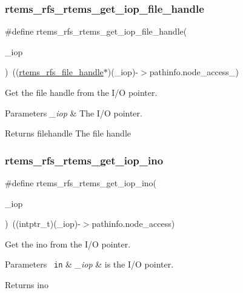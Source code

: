 \subsubsection{\texorpdfstring{rtems\_rfs\_rtems\_get\_iop\_file\_handle}{rtems\_rfs\_rtems\_get\_iop\_file\_handle}}
{\footnotesize\ttfamily \#define rtems\+\_\+rfs\+\_\+rtems\+\_\+get\+\_\+iop\+\_\+file\+\_\+handle(\begin{DoxyParamCaption}\item[{}]{\+\_\+iop }\end{DoxyParamCaption})~((\mbox{\hyperlink{rtems-rfs-file_8h_a35a0f4ad45bd35ea0af7df0aa0ad893b}{rtems\+\_\+rfs\+\_\+file\+\_\+handle}}$\ast$)(\+\_\+iop)-\/$>$pathinfo.\+node\+\_\+access\+\_)}

Get the file handle from the I/O pointer.


\begin{DoxyParams}{Parameters}
{\em \+\_\+iop} & The I/O pointer. \\
\hline
\end{DoxyParams}
\begin{DoxyReturn}{Returns}
filehandle The file handle 
\end{DoxyReturn}
\mbox{\label{rtems-rfs-rtems_8h_a456d40a3292d116678781f8efa96e632}} 
\subsubsection{\texorpdfstring{rtems\_rfs\_rtems\_get\_iop\_ino}{rtems\_rfs\_rtems\_get\_iop\_ino}}
{\footnotesize\ttfamily \#define rtems\+\_\+rfs\+\_\+rtems\+\_\+get\+\_\+iop\+\_\+ino(\begin{DoxyParamCaption}\item[{}]{\+\_\+iop }\end{DoxyParamCaption})~((intptr\+\_\+t)(\+\_\+iop)-\/$>$pathinfo.\+node\+\_\+access)}

Get the ino from the I/O pointer.


\begin{DoxyParams}[1]{Parameters}
\mbox{\texttt{ in}}  & {\em \+\_\+iop} & is the I/O pointer. \\
\hline
\end{DoxyParams}
\begin{DoxyReturn}{Returns}
ino 
\end{DoxyReturn}
\mbox{\label{rtems-rfs-rtems_8h_a578137ab6e4164a0ded6d24cd6ab9646}} 
